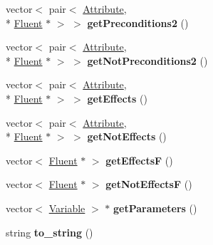 \begin{DoxyCompactItemize}
\item 
\hypertarget{classDurativeAction_a82382a2fef6b90736fae06f0f19f1043}{vector$<$ pair$<$ \hyperlink{classAttribute}{Attribute}, \\*
\hyperlink{classFluent}{Fluent} $\ast$ $>$ $>$ {\bfseries get\+Preconditions2} ()}\label{classDurativeAction_a82382a2fef6b90736fae06f0f19f1043}

\item 
\hypertarget{classDurativeAction_a38f17e27f96ee72c76a84cc93f3ea9cb}{vector$<$ pair$<$ \hyperlink{classAttribute}{Attribute}, \\*
\hyperlink{classFluent}{Fluent} $\ast$ $>$ $>$ {\bfseries get\+Not\+Preconditions2} ()}\label{classDurativeAction_a38f17e27f96ee72c76a84cc93f3ea9cb}

\item 
\hypertarget{classDurativeAction_abf35a960adb271d0e927e979e96e1735}{vector$<$ pair$<$ \hyperlink{classAttribute}{Attribute}, \\*
\hyperlink{classFluent}{Fluent} $\ast$ $>$ $>$ {\bfseries get\+Effects} ()}\label{classDurativeAction_abf35a960adb271d0e927e979e96e1735}

\item 
\hypertarget{classDurativeAction_af83c8738d366161a764ee52f0535ae96}{vector$<$ pair$<$ \hyperlink{classAttribute}{Attribute}, \\*
\hyperlink{classFluent}{Fluent} $\ast$ $>$ $>$ {\bfseries get\+Not\+Effects} ()}\label{classDurativeAction_af83c8738d366161a764ee52f0535ae96}

\item 
\hypertarget{classDurativeAction_ab2caf6a417e3b2488ac629e4cd238b78}{vector$<$ \hyperlink{classFluent}{Fluent} $\ast$ $>$ {\bfseries get\+Effects\+F} ()}\label{classDurativeAction_ab2caf6a417e3b2488ac629e4cd238b78}

\item 
\hypertarget{classDurativeAction_a85c481dadbde2b4d3d9d8188aa64e69b}{vector$<$ \hyperlink{classFluent}{Fluent} $\ast$ $>$ {\bfseries get\+Not\+Effects\+F} ()}\label{classDurativeAction_a85c481dadbde2b4d3d9d8188aa64e69b}

\item 
\hypertarget{classDurativeAction_a64263c735f86e51cc876b942d3cc71f6}{vector$<$ \hyperlink{classVariable}{Variable} $>$ $\ast$ {\bfseries get\+Parameters} ()}\label{classDurativeAction_a64263c735f86e51cc876b942d3cc71f6}

\item 
\hypertarget{classDurativeAction_a2e470b8ed1db9bd0ad66890ff6ec4c47}{string {\bfseries to\+\_\+string} ()}\label{classDurativeAction_a2e470b8ed1db9bd0ad66890ff6ec4c47}


\end{DoxyCompactItemize}
